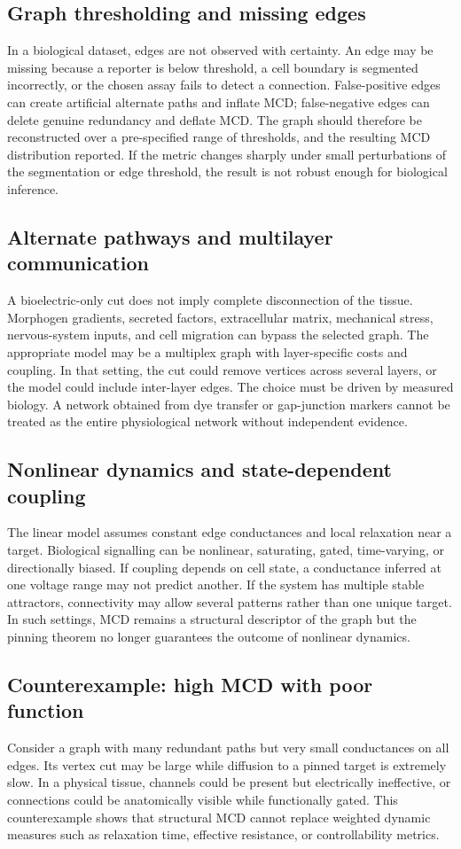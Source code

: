 \documentclass[12pt,a4paper]{article}
\begin{document}
\subsection{Graph thresholding and missing edges}
In a biological dataset, edges are not observed with certainty. An edge may be missing because a reporter is below threshold, a cell boundary is segmented incorrectly, or the chosen assay fails to detect a connection. False-positive edges can create artificial alternate paths and inflate MCD; false-negative edges can delete genuine redundancy and deflate MCD. The graph should therefore be reconstructed over a pre-specified range of thresholds, and the resulting MCD distribution reported. If the metric changes sharply under small perturbations of the segmentation or edge threshold, the result is not robust enough for biological inference.

\subsection{Alternate pathways and multilayer communication}
A bioelectric-only cut does not imply complete disconnection of the tissue. Morphogen gradients, secreted factors, extracellular matrix, mechanical stress, nervous-system inputs, and cell migration can bypass the selected graph. The appropriate model may be a multiplex graph with layer-specific costs and coupling. In that setting, the cut could remove vertices across several layers, or the model could include inter-layer edges. The choice must be driven by measured biology. A network obtained from dye transfer or gap-junction markers cannot be treated as the entire physiological network without independent evidence.

\subsection{Nonlinear dynamics and state-dependent coupling}
The linear model assumes constant edge conductances and local relaxation near a target. Biological signalling can be nonlinear, saturating, gated, time-varying, or directionally biased. If coupling depends on cell state, a conductance inferred at one voltage range may not predict another. If the system has multiple stable attractors, connectivity may allow several patterns rather than one unique target. In such settings, MCD remains a structural descriptor of the graph but the pinning theorem no longer guarantees the outcome of nonlinear dynamics.

\subsection{Counterexample: high MCD with poor function}
Consider a graph with many redundant paths but very small conductances on all edges. Its vertex cut may be large while diffusion to a pinned target is extremely slow. In a physical tissue, channels could be present but electrically ineffective, or connections could be anatomically visible while functionally gated. This counterexample shows that structural MCD cannot replace weighted dynamic measures such as relaxation time, effective resistance, or controllability metrics.
\end{document}
